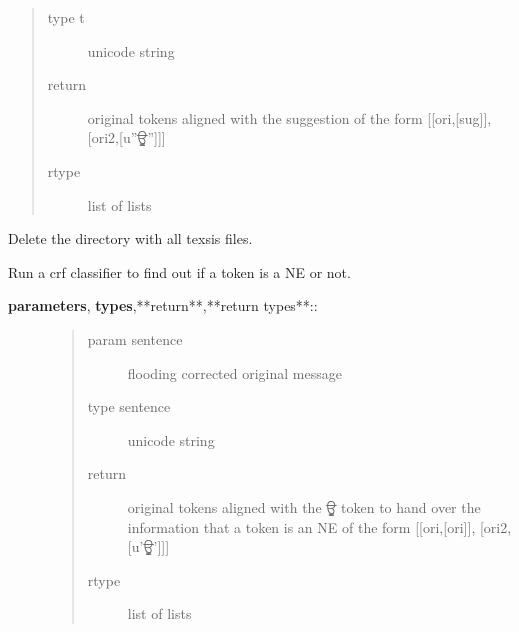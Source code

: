 \documentclass[letterpaper,10pt,english]{sphinxmanual}
\begin{document}
\begin{fulllineitems}
\begin{fulllineitems}
\begin{description}
\begin{quote}
\begin{description}
\item[{type t}] \leavevmode
unicode string

\item[{return}] \leavevmode
original tokens aligned with the suggestion of the form {[}{[}ori,{[}sug{]}{]},{[}ori2,{[}u''ਊ''{]}{]}{]}

\item[{rtype}] \leavevmode
list of lists

\end{description}\end{quote}

\end{description}

\end{fulllineitems}


\begin{fulllineitems}
\label{API:norm.modules.new_NE.New_NE.clean_up}
Delete the directory with all texsis files.

\end{fulllineitems}


\begin{fulllineitems}
\label{API:norm.modules.new_NE.New_NE.generate_alternatives}
Run a crf classifier to find out if a token is a NE or not.
\begin{description}
\item[{\textbf{parameters}, \textbf{types},**return**,**return types**::}] \leavevmode\begin{quote}\begin{description}
\item[{param sentence}] \leavevmode
flooding corrected original message

\item[{type sentence}] \leavevmode
unicode string

\item[{return}] \leavevmode
original tokens aligned with the ਊ token to hand over the information that a token is an NE of the form {[}{[}ori,{[}ori{]}{]},  {[}ori2,  {[}u'ਊ'{]}{]}{]}

\item[{rtype}] \leavevmode
list of lists


\end{description}
\end{quote}
\end{description}
\end{fulllineitems}
\end{fulllineitems}
\end{document}
